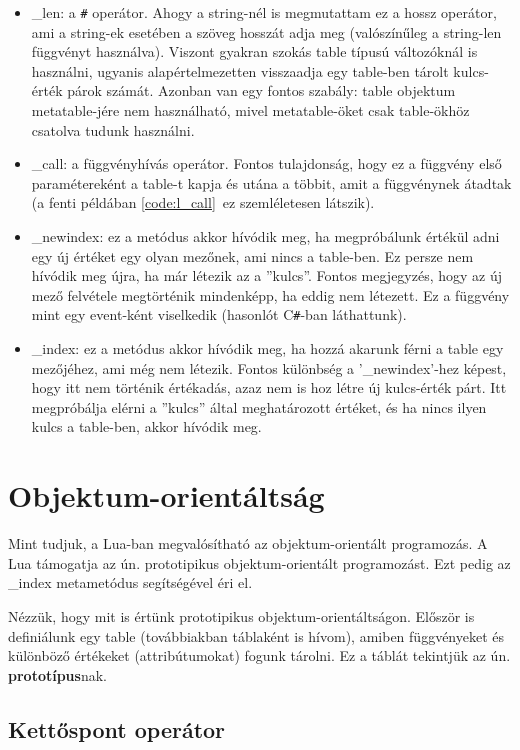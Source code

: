 \begin{itemize}
	\item \_len: a \verb|#| operátor. Ahogy a string-nél is megmutattam ez a hossz operátor, ami a string-ek esetében a szöveg hosszát adja meg (valószínűleg a string-len függvényt használva). Viszont gyakran szokás table típusú változóknál is használni, ugyanis alapértelmezetten visszaadja egy table-ben tárolt kulcs-érték párok számát. Azonban van egy fontos szabály: table objektum metatable-jére nem használható, mivel metatable-öket csak table-ökhöz csatolva tudunk használni.
	\item \_call: a függvényhívás operátor. Fontos tulajdonság, hogy ez a függvény első paramétereként a table-t kapja és utána a többit, amit a függvénynek átadtak (a fenti példában \ref{code:l_call}~ez szemléletesen látszik).
	\item \_newindex: ez a metódus akkor hívódik meg, ha megpróbálunk értékül adni egy új értéket egy olyan mezőnek, ami nincs a table-ben. Ez persze nem hívódik meg újra, ha már létezik az a ''kulcs''. Fontos megjegyzés, hogy az új mező felvétele megtörténik mindenképp, ha eddig nem létezett. Ez a függvény mint egy event-ként viselkedik (hasonlót C\verb|#|-ban láthattunk).
	\item \_index: ez a metódus akkor hívódik meg, ha hozzá akarunk férni a table egy mezőjéhez, ami még nem létezik. Fontos különbség a '\_newindex'-hez képest, hogy itt nem történik értékadás, azaz nem is hoz létre új kulcs-érték párt. Itt megpróbálja elérni a ''kulcs'' által meghatározott értéket, és ha nincs ilyen kulcs a table-ben, akkor hívódik meg.
\end{itemize}

\section{Objektum-orientáltság}
\label{sec:l_OO}

Mint tudjuk, a Lua-ban megvalósítható az objektum-orientált programozás. A Lua támogatja az ún. prototipikus objektum-orientált programozást. Ezt pedig az \_index metametódus segítségével éri el. 

Nézzük, hogy mit is értünk prototipikus objektum-orientáltságon. Először is definiálunk egy table (továbbiakban táblaként is hívom), amiben függvényeket és különböző értékeket (attribútumokat) fogunk tárolni. Ez a táblát tekintjük az ún. \textbf{prototípus}nak.

\subsection{Kettőspont operátor}
\label{subsec:l_colon}

